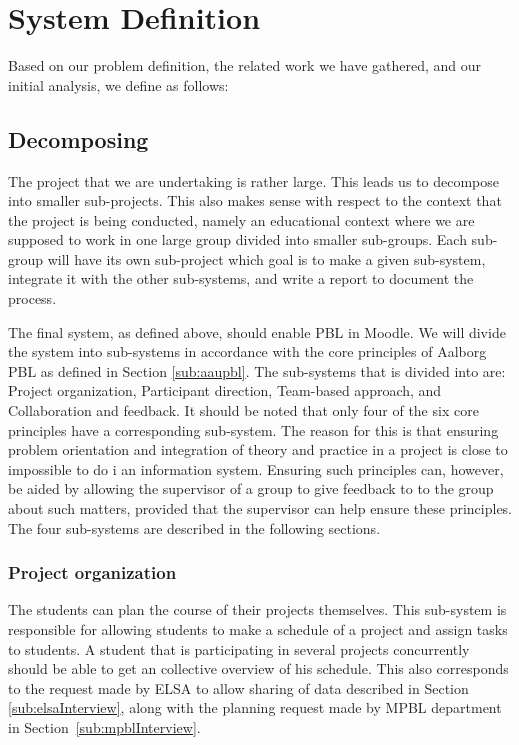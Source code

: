 \section{System Definition}
\label{sec:systemDef}
Based on our problem definition, the related work we have gathered, and our initial analysis, we define \system as follows:












\subsection{Decomposing \system}
\label{sub:decomposingSys}
The project that we are undertaking is rather large.
This leads us to decompose into smaller sub-projects.
This also makes sense with respect to the context that the project is being conducted, namely an educational context where we are supposed to work in one large group divided into smaller sub-groups.
Each sub-group will have its own sub-project which goal is to make a given sub-system, integrate it with the other sub-systems, and write a report to document the process.

The final system, as defined above, should enable PBL in Moodle.
We will divide the system into sub-systems in accordance with the core principles of Aalborg PBL as defined in Section \ref{sub:aaupbl}.
The sub-systems that \system is divided into are:
Project organization,
Participant direction,
Team-based approach, and
Collaboration and feedback.
It should be noted that only four of the six core principles have a corresponding sub-system.
The reason for this is that ensuring problem orientation and integration of theory and practice in a project is close to impossible to do i an information system.
Ensuring such principles can, however, be aided by allowing the supervisor of a group to give feedback to to the group about such matters, provided that the supervisor can help ensure these principles.
The four sub-systems are described in the following sections.

\subsubsection{Project organization}
The students can plan the course of their projects themselves.
This sub-system is responsible for allowing students to make a schedule of a project and assign tasks to students.
A student that is participating in several projects concurrently should be able to get an collective overview of his schedule.
This also corresponds to the request made by ELSA to allow sharing of data described in Section \ref{sub:elsaInterview}, along with the planning request made by MPBL department in Section~\ref{sub:mpblInterview}.

